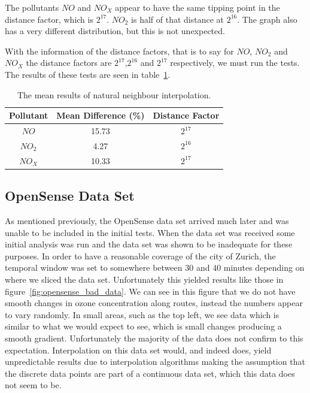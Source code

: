         	The pollutants $NO$ and $NO_{X}$ appear to have the same tipping point in the distance factor, which is $2^{17}$. $NO_{2}$ is half of that distance at $2^{16}$. The graph also has a very different distribution, but this is not unexpected.

        	With the information of the distance factors, that is to say for $NO$, $NO_{2}$ and $NO_{X}$ the distance factors are $2^{17}$,$2^{16}$ and $2^{17}$ respectively, we must run the tests. The results of these tests are seen in table~\ref{tab:barnes_results}.

        	\begin{table}
				\centering
	    		\begin{tabular}{|c|c|c|}
	    			\hline
					Pollutant & Mean Difference (\%) & Distance Factor \\ \hline
					$NO$ & 15.73 & $2^{17}$\\
					$NO_{2}$ & 4.27 & $2^{16}$ \\
					$NO_{X}$ & 10.33 & $2^{17}$ \\
					\hline
				\end{tabular}
				\caption{The mean results of natural neighbour interpolation.}
				\label{tab:barnes_results}
			\end{table} 

		\subsection{OpenSense Data Set}\label{prediction_evaluation_results_opensense_data_set}

			As mentioned previously, the OpenSense data set arrived much later and was unable to be included in the initial tests. When the data set was received some initial analysis was run and the data set was shown to be inadequate for these purposes. In order to have a reasonable coverage of the city of Zurich, the temporal window was set to somewhere between 30 and 40 minutes depending on where we sliced the data set. Unfortunately this yielded results like those in figure~\ref{fig:opensense_bad_data}. We can see in this figure that we do not have smooth changes in ozone concentration along routes, instead the numbers appear to vary randomly. In small areas, such as the top left, we see data which is similar to what we would expect to see, which is small changes producing a smooth gradient. Unfortunately the majority of the data does not confirm to this expectation. Interpolation on this data set would, and indeed does, yield unpredictable results due to interpolation algorithms making the assumption that the discrete data points are part of a continuous data set, which this data does not seem to be. 

